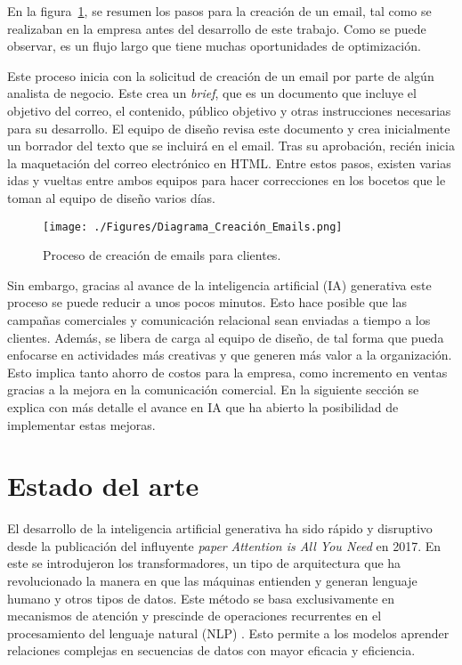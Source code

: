 En la figura~\ref{fig:procesoEmail}, se resumen los pasos para la creación de un email, tal como se realizaban en la empresa antes del desarrollo de este trabajo. Como se puede observar, es un flujo largo que tiene muchas oportunidades de optimización. 

Este proceso inicia con la solicitud de creación de un email por parte de algún analista de negocio. Este crea un \textit{brief}, que es un documento que incluye el objetivo del correo, el contenido, público objetivo y otras instrucciones necesarias para su desarrollo. El equipo de diseño revisa este documento y crea inicialmente un borrador del texto que se incluirá en el email. Tras su aprobación, recién inicia la maquetación del correo electrónico en HTML. Entre estos pasos, existen varias idas y vueltas entre ambos equipos para hacer correcciones en los bocetos que le toman al equipo de diseño varios días.

\begin{figure}[H]
\centering
\texttt{[image: ./Figures/Diagrama\_Creación\_Emails.png]}
\caption{Proceso de creación de emails para clientes.}
\label{fig:procesoEmail}
\end{figure}



Sin embargo, gracias al avance de la inteligencia artificial (IA) generativa este proceso se puede reducir a unos pocos minutos. Esto hace posible que las campañas comerciales y comunicación relacional sean enviadas a tiempo a los clientes. Además, se libera de carga al equipo de diseño, de tal forma que pueda enfocarse en actividades más creativas y que generen más valor a la organización. Esto implica tanto ahorro de costos para la empresa, como incremento en ventas gracias a la mejora en la comunicación comercial. En la siguiente sección se explica con más detalle el avance en IA que ha abierto la posibilidad de implementar estas mejoras.


\section{Estado del arte}
\label{sec:estadodelarte}

El desarrollo de la inteligencia artificial generativa ha sido rápido y disruptivo desde la publicación del influyente \textit{paper} \textit{Attention is All You Need} \citep{Vaswani2017} en 2017. En este se introdujeron los transformadores, un tipo de arquitectura que ha revolucionado la manera en que las máquinas entienden y generan lenguaje humano y otros tipos de datos. Este método se basa exclusivamente en mecanismos de atención y prescinde de operaciones recurrentes en el procesamiento del lenguaje natural (NLP) \citep{Vaswani2017}. Esto permite a los modelos aprender relaciones complejas en secuencias de datos con mayor eficacia y eficiencia.

